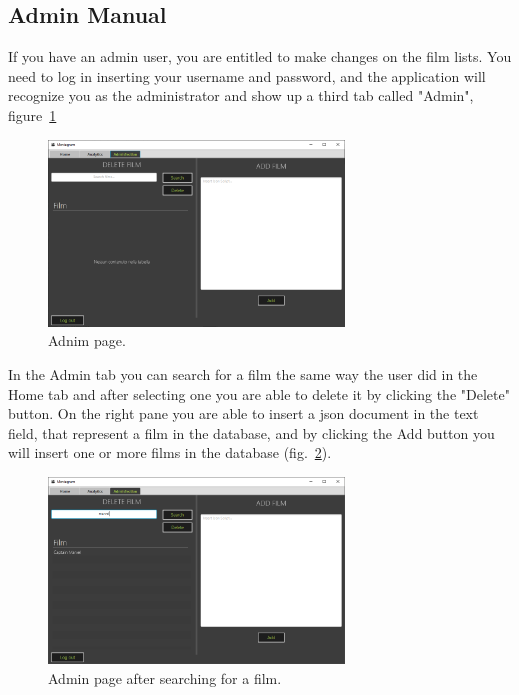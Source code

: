 \documentclass[a4paper, oneside]{article}
\begin{document}
\subsection{Admin Manual}
If you have an admin user, you are entitled to make changes on the film lists. You need to log in inserting your username and password, and the application will recognize you as the administrator and show up a third tab called "Admin", figure~\ref{fig:admin0}
\begin{figure}[H]
\centering
\includegraphics[width=0.7\textwidth]{./images/screens/admin0} 
\caption{Adnim page.}
\label{fig:admin0}
\end{figure}

\noindent In the Admin tab you can search for a film the same way the user did in the Home tab and after selecting one you are able to delete it by clicking the "Delete" button. On the right pane you are able to insert a json document in the text field, that represent a film in the database, and by clicking the Add button you will insert one or more films in the database (fig.~\ref{fig:admin1}).
\begin{figure}[H]
\centering
\includegraphics[width=0.7\textwidth]{./images/screens/admin1} 
\caption{Admin page after searching for a film.}
\label{fig:admin1}
\end{figure}
\end{document}

